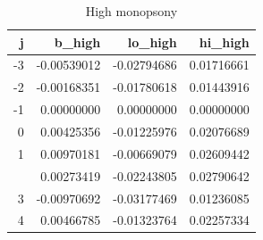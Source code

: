 \begin{table}

\caption{High monopsony}
\centering
\begin{tabular}[t]{rrrr}
\toprule
j & b\_high & lo\_high & hi\_high\\
\midrule
-3 & -0.00539012 & -0.02794686 & 0.01716661\\
-2 & -0.00168351 & -0.01780618 & 0.01443916\\
-1 & 0.00000000 & 0.00000000 & 0.00000000\\
0 & 0.00425356 & -0.01225976 & 0.02076689\\
1 & 0.00970181 & -0.00669079 & 0.02609442\\
\addlinespace
2 & 0.00273419 & -0.02243805 & 0.02790642\\
3 & -0.00970692 & -0.03177469 & 0.01236085\\
4 & 0.00466785 & -0.01323764 & 0.02257334\\
\bottomrule
\end{tabular}
\end{table}
